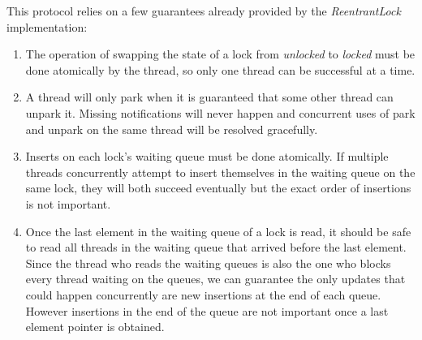 This protocol relies on a few guarantees already provided by the \emph{ReentrantLock} implementation:
\begin{enumerate}
\item The operation of swapping the state of a lock from \emph{unlocked} to \emph{locked} must be done atomically by the thread, so only one thread can be successful at a time.
\item A thread will only park when it is guaranteed that some other thread can unpark it. Missing notifications will never happen and concurrent uses of park and unpark on the same thread will be resolved gracefully.
\item Inserts on each lock's waiting queue must be done atomically. If multiple threads concurrently attempt to insert themselves in the waiting queue on the same lock, they will both succeed eventually but the exact order of insertions is not important.
\item Once the last element in the waiting queue of a lock is read, it should be safe to read all threads in the waiting queue that arrived before the last element. Since the thread who reads the waiting queues is also the one who blocks every thread waiting on the queues, we can guarantee the only updates that could happen concurrently are new insertions at the end of each queue. However insertions in the end of the queue are not important once a last element pointer is obtained.
\end{enumerate}


